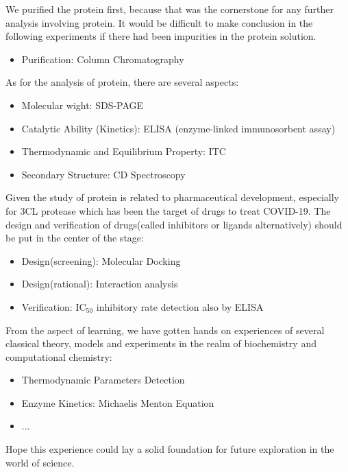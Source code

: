 \documentclass{report}
\begin{document}
We purified the protein first, because that was the cornerstone for any further analysis involving protein.
It would be difficult to make conclusion in the following experiments if there had been impurities in the protein solution.
\begin{itemize}
    \item Purification: Column Chromatography
\end{itemize}
As for the analysis of protein, there are several aspects:
\begin{itemize}
    \item Molecular wight: SDS-PAGE
    \item Catalytic Ability (Kinetics): ELISA (enzyme-linked immunosorbent assay)
    \item Thermodynamic and Equilibrium Property: ITC
    \item Secondary Structure: CD Spectroscopy
\end{itemize}

Given the study of protein is related to pharmaceutical development, especially for 3CL protease which has been the target of drugs to treat COVID-19.
The design and verification of drugs(called inhibitors or ligands alternatively) should be put in the center of the stage:
\begin{itemize}
    \item Design(screening): Molecular Docking
    \item Design(rational): Interaction analysis
    \item Verification: IC$_{50}$ inhibitory rate detection also by ELISA
\end{itemize}

From the aspect of learning, we have gotten hands on experiences of several classical theory, models and experiments in the realm of biochemistry and computational chemistry:
\begin{itemize}
    \item Thermodynamic Parameters Detection
    \item Enzyme Kinetics: Michaelis Menton Equation
    \item ...
\end{itemize}

Hope this experience could lay a solid foundation for future exploration in the world of science.


\appendix
\end{document}
